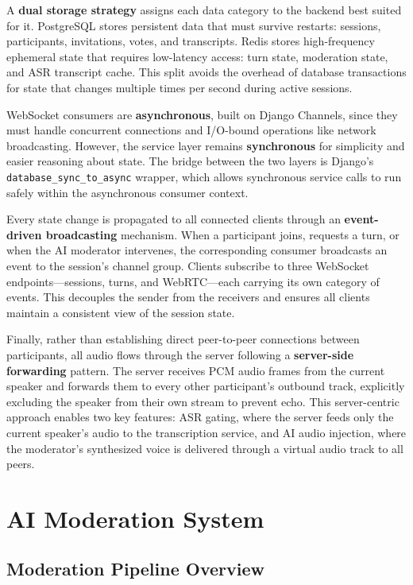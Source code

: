 A \textbf{dual storage strategy} assigns each data category to the backend best suited for it. PostgreSQL stores persistent data that must survive restarts: sessions, participants, invitations, votes, and transcripts. Redis stores high-frequency ephemeral state that requires low-latency access: turn state, moderation state, and ASR transcript cache. This split avoids the overhead of database transactions for state that changes multiple times per second during active sessions.

WebSocket consumers are \textbf{asynchronous}, built on Django Channels, since they must handle concurrent connections and I/O-bound operations like network broadcasting. However, the service layer remains \textbf{synchronous} for simplicity and easier reasoning about state. The bridge between the two layers is Django's \texttt{database\_sync\_to\_async} wrapper, which allows synchronous service calls to run safely within the asynchronous consumer context.

Every state change is propagated to all connected clients through an \textbf{event-driven broadcasting} mechanism. When a participant joins, requests a turn, or when the AI moderator intervenes, the corresponding consumer broadcasts an event to the session's channel group. Clients subscribe to three WebSocket endpoints---sessions, turns, and WebRTC---each carrying its own category of events. This decouples the sender from the receivers and ensures all clients maintain a consistent view of the session state.

Finally, rather than establishing direct peer-to-peer connections between participants, all audio flows through the server following a \textbf{server-side forwarding} pattern. The server receives PCM audio frames from the current speaker and forwards them to every other participant's outbound track, explicitly excluding the speaker from their own stream to prevent echo. This server-centric approach enables two key features: ASR gating, where the server feeds only the current speaker's audio to the transcription service, and AI audio injection, where the moderator's synthesized voice is delivered through a virtual audio track to all peers.


\section{AI Moderation System}

\subsection{Moderation Pipeline Overview}

